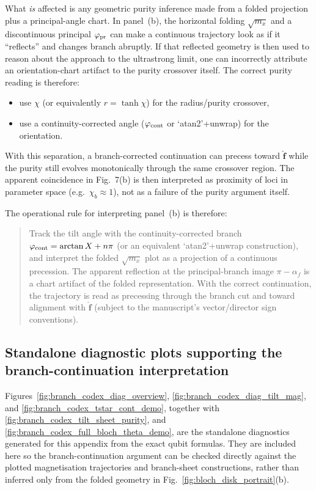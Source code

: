 What \emph{is} affected is any geometric purity inference made from a folded
projection plus a principal-angle chart.  In panel~(b), the horizontal folding
$\sqrt{m_x}$ and a discontinuous principal $\varphi_{\rm pr}$ can make a
continuous trajectory look as if it ``reflects'' and changes branch abruptly.
If that reflected geometry is then used to reason about the approach to the
ultrastrong limit, one can incorrectly attribute an orientation-chart artifact
to the purity crossover itself.  The correct purity reading is therefore:
\begin{itemize}
    \item use $\chi$ (or equivalently $r=\tanh\chi$) for the radius/purity
    crossover,
    \item use a continuity-corrected angle ($\varphi_{\rm cont}$ or
    `atan2'+unwrap) for the orientation.
\end{itemize}
With this separation, a branch-corrected continuation can precess toward
$\hat{\mathbf f}$ while the purity still evolves monotonically through the same
crossover region.  The apparent coincidence in Fig.~7(b) is then interpreted as
proximity of loci in parameter space (e.g.\ $\chi_b\approx 1$), not as a
failure of the purity argument itself.

The operational rule for interpreting panel~(b) is therefore:
\begin{quote}
Track the tilt angle with the continuity-corrected branch
$\varphi_{\rm cont}=\arctan X + n\pi$ (or an equivalent `atan2'+unwrap
construction), and interpret the folded $\sqrt{m_x}$ plot as a projection of a
continuous precession.  The apparent reflection at the principal-branch image
$\pi-\alpha_f$ is a chart artifact of the folded representation.  With the
correct continuation, the trajectory is read as precessing through the branch
cut and toward alignment with $\hat{\mathbf f}$ (subject to the manuscript's
vector/director sign conventions).
\end{quote}

\subsection{Standalone diagnostic plots supporting the branch-continuation interpretation}

Figures~\ref{fig:branch_codex_diag_overview},
\ref{fig:branch_codex_diag_tilt_mag}, and
\ref{fig:branch_codex_tstar_cont_demo}, together with
\ref{fig:branch_codex_tilt_sheet_purity}, and
\ref{fig:branch_codex_full_bloch_theta_demo}, are the standalone diagnostics
generated for this appendix from the exact qubit formulas. They are included
here so the branch-continuation argument can be checked directly against the
plotted magnetisation trajectories and branch-sheet constructions, rather than
inferred only from the folded geometry in Fig.~\ref{fig:bloch_disk_portrait}(b).

